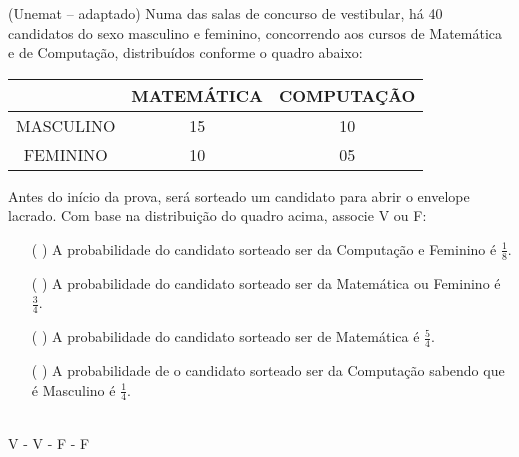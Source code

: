 \begin{ex}
(Unemat – adaptado) Numa das salas de concurso de vestibular, há 40 candidatos do sexo masculino e feminino, concorrendo aos cursos de Matemática e de Computação, distribuídos conforme o quadro abaixo:
\begin{center}
\begin{tabular}{|c|c|c|}  \hline
   &  MATEMÁTICA  &   COMPUTAÇÃO     \\  \hline
MASCULINO &     15       &     10           \\  \hline
FEMININO  &     10       &     05           \\  \hline   
\end{tabular}
\end{center}
Antes do início da prova, será sorteado um candidato para abrir o envelope lacrado.	Com base na distribuição do quadro acima, associe V ou F:
   \begin{itemize}
   \item [(    )]  A probabilidade do candidato sorteado ser da Computação e Feminino é $\frac{1}{8}$.
   \item [(   )] A probabilidade do candidato sorteado ser da Matemática ou Feminino é $\frac{3}{4}$.
   \item [(   )] A probabilidade do candidato sorteado ser de Matemática é $\frac{5}{4}$.
   \item [(   )]  A probabilidade de o candidato sorteado ser da Computação sabendo que é Masculino é $\frac{1}{4}$.
   \end{itemize}
     \begin{sol}
      \phantom{A} \\
      V - V - F - F
     \end{sol}
\end{ex}